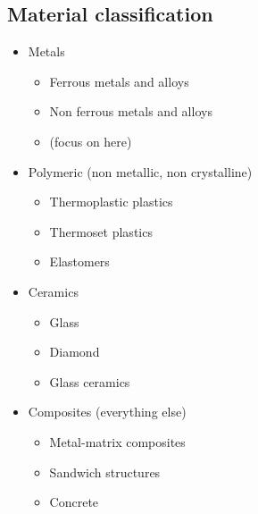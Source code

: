 \subsection{Material classification}
\begin{itemize}
	\item Metals
	      \begin{itemize}
		      \item Ferrous metals and alloys
		      \item Non ferrous metals and alloys
		      \item (focus on here)
	      \end{itemize}
	\item Polymeric (non metallic, non crystalline)
	      \begin{itemize}
		      \item Thermoplastic plastics
		      \item Thermoset plastics
		      \item Elastomers
	      \end{itemize}
	\item Ceramics
	      \begin{itemize}
		      \item Glass
		      \item Diamond
		      \item Glass ceramics
	      \end{itemize}
	\item Composites (everything else)
	      \begin{itemize}
		      \item Metal-matrix composites
		      \item Sandwich structures
		      \item Concrete
	      \end{itemize}
\end{itemize}
